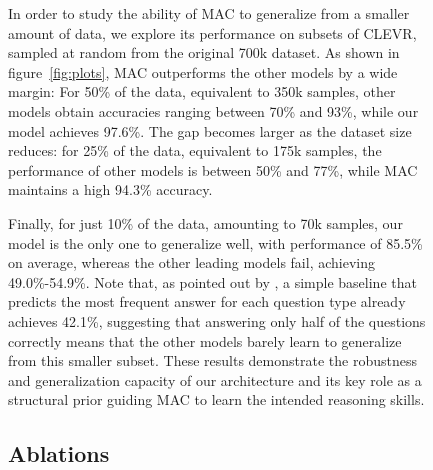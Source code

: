 \documentclass[fleqn]{article}
\newcommand{\figref}[1]{figure~\ref{fig:#1}}
\begin{document}
\begin{figure}[t]
\begin{minipage}{0.55\textwidth}
In order to study the ability of MAC to generalize from a smaller amount of data, we explore its performance on subsets of CLEVR, sampled at random from the original 700k dataset. As shown in \figref{plots}, MAC outperforms the other models by a wide margin: For 50\% of the data, equivalent to 350k samples, other models obtain accuracies ranging between 70\% and 93\%, while our model achieves 97.6\%. The gap becomes larger as the dataset size reduces: for 25\% of the data, equivalent to 175k samples, the performance of other models is between 50\% and 77\%, while MAC maintains a high 94.3\% accuracy. 

Finally, for just 10\% of the data, amounting to 70k samples, our model is the only one to generalize well, with performance of 85.5\% on average, whereas the other leading models fail, achieving 49.0\%-54.9\%. Note that, as pointed out by \citet{clevr}, a simple baseline that predicts the most frequent answer for each question type already achieves 42.1\%, suggesting that answering only half of the questions correctly means that the other models barely learn to generalize from this smaller subset. These results demonstrate the robustness and generalization capacity of our architecture and its key role as a structural prior guiding MAC to learn the intended reasoning skills.

\subsection{Ablations}
\label{sec:ablations}


\end{minipage}
\end{figure}
\end{document}
